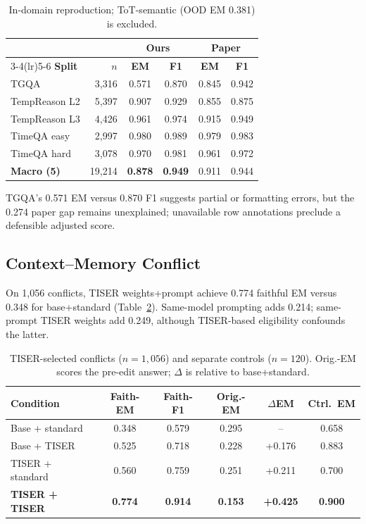 \documentclass[conference]{IEEEtran}
\begin{document}
\begin{table}[t]
\centering
\caption{In-domain reproduction; ToT-semantic (OOD EM 0.381) is excluded.}
\label{tab:baseline}
\setlength{\tabcolsep}{3.7pt}
{\footnotesize
\begin{tabular}{lrcccc}
\toprule
& & \multicolumn{2}{c}{\textbf{Ours}} & \multicolumn{2}{c}{\textbf{Paper}} \\
\cmidrule(lr){3-4}\cmidrule(lr){5-6}
\textbf{Split} & \textbf{$n$} & \textbf{EM} & \textbf{F1} & \textbf{EM} & \textbf{F1} \\
\midrule
TGQA            & 3{,}316 & 0.571 & 0.870 & 0.845 & 0.942 \\
TempReason L2   & 5{,}397 & 0.907 & 0.929 & 0.855 & 0.875 \\
TempReason L3   & 4{,}426 & 0.961 & 0.974 & 0.915 & 0.949 \\
TimeQA easy     & 2{,}997 & 0.980 & 0.989 & 0.979 & 0.983 \\
TimeQA hard     & 3{,}078 & 0.970 & 0.981 & 0.961 & 0.972 \\
\midrule
\rowcolor{gray!18}
\textbf{Macro (5)} & 19{,}214 & \textbf{0.878} & \textbf{0.949} & 0.911 & 0.944 \\
\bottomrule
\end{tabular}
}
\end{table}

TGQA's 0.571 EM versus 0.870 F1 suggests partial or formatting errors, but the 0.274 paper gap remains unexplained; unavailable row annotations preclude a defensible adjusted score.

\subsection{Context--Memory Conflict}

On 1,056 conflicts, TISER weights+prompt achieve 0.774 faithful EM versus 0.348 for base+standard (Table~\ref{tab:conflict}). Same-model prompting adds 0.214; same-prompt TISER weights add 0.249, although TISER-based eligibility confounds the latter.

\begin{table}[t]
\centering
\caption{TISER-selected conflicts ($n=1{,}056$) and separate controls ($n=120$). Orig.-EM scores the pre-edit answer; $\Delta$ is relative to base+standard.}
\label{tab:conflict}
\setlength{\tabcolsep}{1.4pt}
{\footnotesize
\begin{tabular}{lccccc}
\toprule
\textbf{Condition} & \textbf{Faith-EM} & \textbf{Faith-F1} & \textbf{Orig.-EM} & \textbf{$\Delta$EM} & \textbf{Ctrl.\ EM} \\
\midrule
Base + standard & 0.348 & 0.579 & 0.295 & --     & 0.658 \\
Base + TISER    & 0.525 & 0.718 & 0.228 & +0.176 & 0.883 \\
TISER + standard & 0.560 & 0.759 & 0.251 & +0.211 & 0.700 \\
\rowcolor{gray!18}
\textbf{TISER + TISER} & \textbf{0.774} & \textbf{0.914} & \textbf{0.153} & \textbf{+0.425} & \textbf{0.900} \\
\bottomrule
\end{tabular}
}
\end{table}
\end{document}
